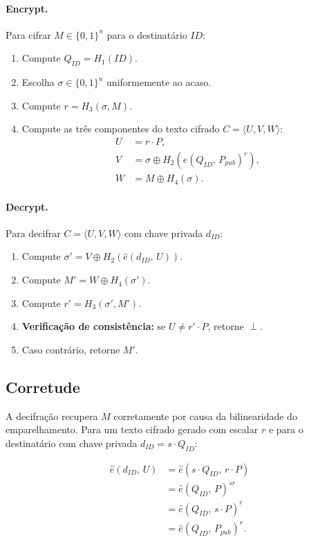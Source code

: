 \paragraph{Encrypt.} Para cifrar $M \in \{0,1\}^n$ para o destinatário $\mathit{ID}$:
\begin{enumerate}
  \item Compute $Q_{\mathit{ID}} = H_1(\mathit{ID})$.
  \item Escolha $\sigma \in \{0,1\}^n$ uniformemente ao acaso.
  \item Compute $r = H_3(\sigma, M)$.
  \item Compute as três componentes do texto cifrado $C = \langle U, V, W \rangle$:
    \begin{align}
      U &= r \cdot P, \label{eq:U}\\
      V &= \sigma \oplus H_2\!\left(\hat{e}(Q_{\mathit{ID}},\, P_{\mathit{pub}})^r\right), \label{eq:V}\\
      W &= M \oplus H_4(\sigma). \label{eq:W}
    \end{align}
\end{enumerate}

\paragraph{Decrypt.} Para decifrar $C = \langle U, V, W \rangle$ com chave privada
$d_{\mathit{ID}}$:
\begin{enumerate}
  \item Compute $\sigma' = V \oplus H_2(\hat{e}(d_{\mathit{ID}},\, U))$.
  \item Compute $M' = W \oplus H_4(\sigma')$.
  \item Compute $r' = H_3(\sigma', M')$.
  \item \textbf{Verificação de consistência:} se $U \neq r' \cdot P$, retorne $\perp$.
  \item Caso contrário, retorne $M'$.
\end{enumerate}

\subsection{Corretude}

A decifração recupera $M$ corretamente por causa da bilinearidade do emparelhamento. Para um
texto cifrado gerado com escalar $r$ e para o destinatário com chave privada
$d_{\mathit{ID}} = s \cdot Q_{\mathit{ID}}$:

\begin{align*}
  \hat{e}(d_{\mathit{ID}},\, U)
  &= \hat{e}(s \cdot Q_{\mathit{ID}},\, r \cdot P) \\
  &= \hat{e}(Q_{\mathit{ID}},\, P)^{sr} \\
  &= \hat{e}(Q_{\mathit{ID}},\, s \cdot P)^r \\
  &= \hat{e}(Q_{\mathit{ID}},\, P_{\mathit{pub}})^r.
\end{align*}

